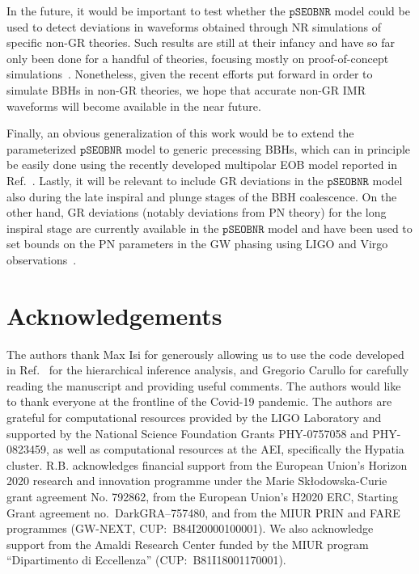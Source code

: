 \documentclass[twocolumn,prd,aps,superscriptaddress,preprintnumbers,tightenlines,showpacs,nofootinbib,eqsecnum,amsfonts,amsmath]{revtex4-1}
\newcommand{\pSEOB}{\texttt{pSEOBNR}}
\begin{document}
In the future, it would be important to test whether the $\pSEOB$  model
could be used to detect deviations in waveforms obtained through NR 
simulations of specific non-GR theories. Such results are still at their 
infancy and have so far only been done for a handful of theories, focusing mostly on proof-of-concept
simulations~\cite{Healy:2011ef,Berti:2013gfa,Cao:2013osa,Okounkova:2017yby,Hirschmann:2017psw,Witek:2018dmd,Okounkova:2019dfo,Okounkova:2019zjf,Okounkova:2020rqw,East:2020hgw}. Nonetheless,
given the recent efforts put forward in order to simulate BBHs in
non-GR theories, we hope that accurate non-GR IMR waveforms will become available in the near future.

Finally, an obvious generalization of this work would be to extend the
parameterized $\pSEOB$ model to generic precessing BBHs, which can in
principle be easily done using the recently developed multipolar EOB
model reported in Ref.~\cite{Ossokine:2020kjp}. Lastly, it will be relevant 
to include GR deviations in the $\pSEOB$ model also during the late inspiral 
and plunge stages of the BBH coalescence. On the other hand, GR deviations (notably 
deviations from PN theory) for the long inspiral stage are currently 
available in the $\pSEOB$ model and have been used to set bounds on the 
PN parameters in the GW phasing using LIGO and Virgo observations~\cite{Abbott:2018lct,
LIGOScientific:2019fpa,Abbott:2020jks}.


\section*{Acknowledgements}
\label{sec:acknowledgements}
The authors thank Max Isi for generously allowing us to use the code developed in Ref.~\cite{Isi:2019asy} for the hierarchical inference analysis, and Gregorio Carullo for carefully reading the manuscript and providing useful comments. The authors would like to thank everyone at the frontline of the Covid-19 pandemic. The authors are grateful for computational resources provided by the LIGO Laboratory and supported by the National Science Foundation Grants PHY-0757058 and PHY-0823459, as well as computational resources at the AEI, specifically the Hypatia cluster. R.B. acknowledges financial support from the European Union's Horizon 2020 research and innovation programme under the Marie Sk\l odowska-Curie grant agreement No. 792862, from the European Union's H2020 ERC, Starting Grant agreement no.~DarkGRA--757480, and from the MIUR PRIN and FARE programmes (GW-NEXT, CUP:~B84I20000100001). We also acknowledge support from the Amaldi Research Center funded by the MIUR program ``Dipartimento di Eccellenza'' (CUP:~B81I18001170001).
\end{document}
